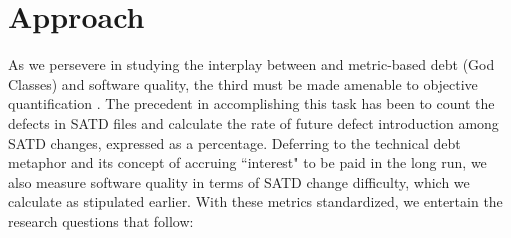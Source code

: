 

\section{Approach}
\label{chap4:sec:approach}
As we persevere in studying the interplay between \SATD and metric-based debt (God Classes) and software quality, the third must be made amenable to objective quantification \cite{Kamei-tse-2013,Kim-tse-2008,sliwerski-msr-2005}. The precedent in accomplishing this task has been to count the defects in SATD files and calculate the rate of future defect introduction among SATD changes, expressed as a percentage. Deferring to the technical debt metaphor and its concept of accruing ``interest" to be paid in the long run, we also measure software quality in terms of SATD change difficulty, which we calculate as stipulated earlier. With these metrics standardized, we entertain the research questions that follow:

